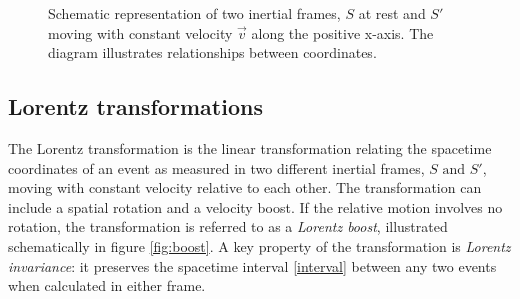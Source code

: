 \documentclass[a4paper]{article}
\begin{document}
\begin{figure}[ht]
    \centering
    \caption{Schematic representation of two inertial frames, \(S\) at rest and \(S'\) moving with constant velocity \(\vec{v}\) along the positive x-axis. The diagram illustrates relationships between coordinates.}
    \label{fig:two-frames}
\end{figure}

\subsection{Lorentz transformations}
The Lorentz transformation is the linear transformation relating the spacetime coordinates of an event as measured in two different inertial frames, \(S \text{ and } S'\), moving with constant velocity relative to each other. The transformation can include a spatial rotation and a velocity boost. If the relative motion involves no rotation, the transformation is referred to as a \textit{Lorentz boost}, illustrated schematically in figure \ref{fig:boost}. A key property of the transformation is \textit{Lorentz invariance}: it preserves the spacetime interval \eqref{interval} between any two events when calculated in either frame.
\end{document}
